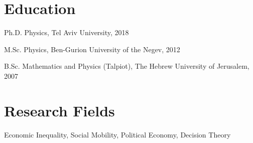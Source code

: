 \documentclass[10pt]{article}
\renewenvironment{itemize}{
  \begin{list}{}{
      \setlength{\leftmargin}{1.0em}
      \setlength{\itemsep}{0.1em}
      \setlength{\parskip}{0pt}
      \setlength{\parsep}{0.2em}
    }
}{
  \end{list}
}
\begin{document}
\section*{Education}

\begin{itemize}
  \item Ph.D. Physics, Tel Aviv University, 2018
  \item M.Sc. Physics, Ben-Gurion University of the Negev, 2012
  \item B.Sc. Mathematics and Physics (Talpiot), The Hebrew University of Jerusalem, 2007
\end{itemize}

\section*{Research Fields}
\begin{itemize}
\item Economic Inequality, Social Mobility, Political Economy, Decision Theory
\end{itemize}
\end{document}
